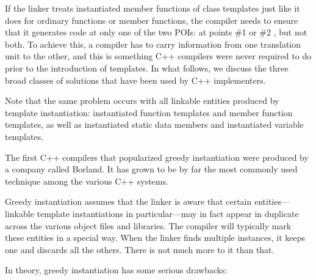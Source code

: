 If the linker treats instantiated member functions of class templates just like it does for ordinary functions or member functions, the compiler needs to ensure that it generates code at only one of the two POIs: at points \#1 or \#2 , but not both. To achieve this, a compiler has to carry information from one translation unit to the other, and this is something C++ compilers were never required to do prior to the introduction of templates. In what follows, we discuss the three broad classes of solutions that have been used by C++ implementers.

Note that the same problem occurs with all linkable entities produced by template instantiation: instantiated function templates and member function templates, as well as instantiated static data members and instantiated variable templates.


The first C++ compilers that popularized greedy instantiation were produced by a company called Borland. It has grown to be by far the most commonly used technique among the various C++ systems.

Greedy instantiation assumes that the linker is aware that certain entities—linkable template instantiations in particular—may in fact appear in duplicate across the various object files and libraries. The compiler will typically mark these entities in a special way. When the linker finds multiple instances, it keeps one and discards all the others. There is not much more to it than that.

In theory, greedy instantiation has some serious drawbacks:

